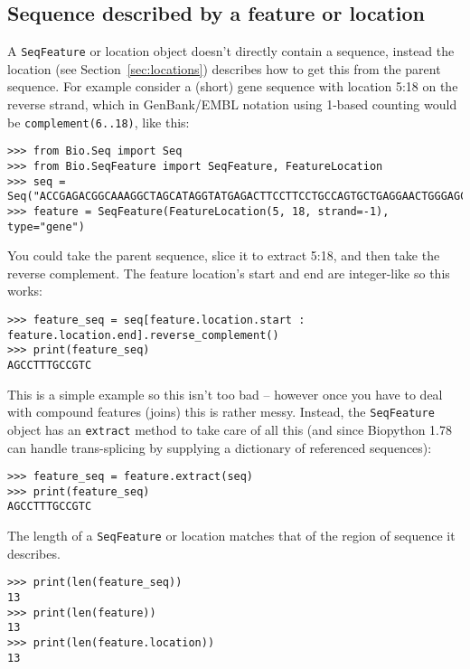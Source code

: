 \subsection{Sequence described by a feature or location}

A \verb|SeqFeature| or location object doesn't directly contain a sequence, instead the location (see Section~\ref{sec:locations}) describes how to get this from the parent sequence. For example consider a (short) gene sequence with location 5:18 on the reverse strand, which in GenBank/EMBL notation using 1-based counting would be \texttt{complement(6..18)}, like this:

\begin{verbatim}
>>> from Bio.Seq import Seq
>>> from Bio.SeqFeature import SeqFeature, FeatureLocation
>>> seq = Seq("ACCGAGACGGCAAAGGCTAGCATAGGTATGAGACTTCCTTCCTGCCAGTGCTGAGGAACTGGGAGCCTAC")
>>> feature = SeqFeature(FeatureLocation(5, 18, strand=-1), type="gene")
\end{verbatim}

You could take the parent sequence, slice it to extract 5:18, and then take the reverse complement.
The feature location's start and end are integer-like so this works:

\begin{verbatim}
>>> feature_seq = seq[feature.location.start : feature.location.end].reverse_complement()
>>> print(feature_seq)
AGCCTTTGCCGTC
\end{verbatim}

This is a simple example so this isn't too bad -- however once you have to deal with compound features (joins) this is rather messy. Instead, the \verb|SeqFeature| object has an \verb|extract| method to take care of all this (and since Biopython 1.78 can handle trans-splicing by supplying a dictionary of referenced sequences):

\begin{verbatim}
>>> feature_seq = feature.extract(seq)
>>> print(feature_seq)
AGCCTTTGCCGTC
\end{verbatim}

The length of a \verb|SeqFeature| or location matches
that of the region of sequence it describes.

\begin{verbatim}
>>> print(len(feature_seq))
13
>>> print(len(feature))
13
>>> print(len(feature.location))
13
\end{verbatim}

